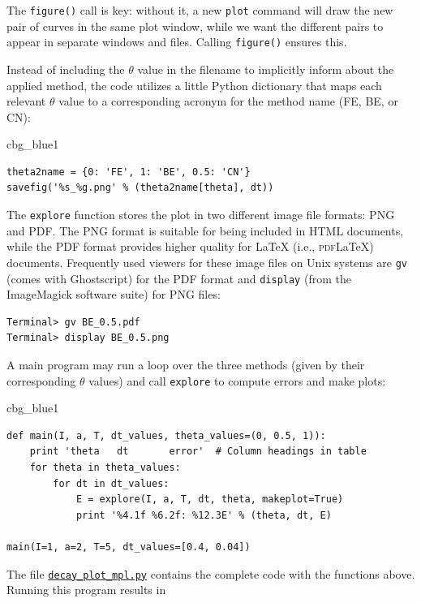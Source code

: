 \documentclass[%
oneside,                 %
final,                   %
10pt]{article}
\newenvironment{_cod_tight}[1]{
   \def\FrameCommand{\colorbox{#1}}
   \FrameRule0.6pt\MakeFramed {\FrameRestore}\vskip3mm}
   {\vskip0mm\endMakeFramed}
\newenvironment{cod}[1]{
\bgroup\rmfamily
\fboxsep=0mm\relax
\begin{_cod_tight}{#1}
\list{}{\parsep=-2mm\parskip=0mm\topsep=0pt\leftmargin=2mm
\rightmargin=2\leftmargin\leftmargin=4pt\relax}
\item\relax}
{\endlist\end{_cod_tight}\egroup}
\begin{document}
The \texttt{figure()} call is key: without it, a new \texttt{plot} command will
draw the new pair of curves in the same plot window, while we want
the different pairs to appear in separate windows and files.
Calling \texttt{figure()} ensures this.

Instead of including the $\theta$ value in the filename to implicitly
inform about the applied method, the code utilizes a little Python
dictionary that maps each relevant $\theta$ value to a corresponding
acronym for the method name (FE, BE, or CN):

\begin{cod}{cbg_blue1}\begin{Verbatim}[numbers=none,fontsize=\fontsize{9pt}{9pt},baselinestretch=0.95,xleftmargin=2mm]
theta2name = {0: 'FE', 1: 'BE', 0.5: 'CN'}
savefig('%s_%g.png' % (theta2name[theta], dt))
\end{Verbatim}
\end{cod}
\noindent

  

The \texttt{explore} function stores the plot in two different image file formats:
PNG and PDF. The PNG format is suitable for
being included in HTML documents, while the PDF format provides
higher quality for {\LaTeX} (i.e., \textsc{pdf}{\LaTeX}) documents.
Frequently used viewers for these
image files on Unix systems are \texttt{gv} (comes with Ghostscript)
for the PDF format and
\texttt{display} (from the ImageMagick software suite) for PNG files:

\begin{Verbatim}[frame=lines,label=\fbox{{\tiny Terminal}},framesep=2.5mm,framerule=0.7pt,fontsize=\fontsize{9pt}{9pt}]
Terminal> gv BE_0.5.pdf
Terminal> display BE_0.5.png
\end{Verbatim}

A main program may run a loop over the three methods (given by
their corresponding $\theta$ values)
and call \texttt{explore} to compute errors and make plots:

\begin{cod}{cbg_blue1}\begin{Verbatim}[numbers=none,fontsize=\fontsize{9pt}{9pt},baselinestretch=0.95,xleftmargin=2mm]
def main(I, a, T, dt_values, theta_values=(0, 0.5, 1)):
    print 'theta   dt       error'  # Column headings in table
    for theta in theta_values:
        for dt in dt_values:
            E = explore(I, a, T, dt, theta, makeplot=True)
            print '%4.1f %6.2f: %12.3E' % (theta, dt, E)

main(I=1, a=2, T=5, dt_values=[0.4, 0.04])
\end{Verbatim}
\end{cod}
\noindent
The file \href{{http://tinyurl.com/ofkw6kc/alg/decay_plot_mpl.py}}{\nolinkurl{decay_plot_mpl.py}}
contains the complete code with the functions above.
Running this program results in
\end{document}
